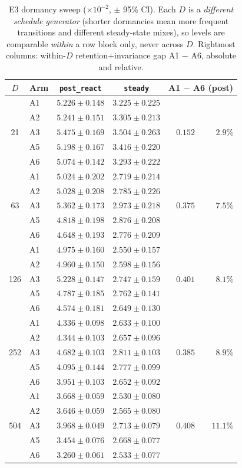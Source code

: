 \documentclass[11pt,a4paper]{article}
\theoremstyle{definition}
\theoremstyle{plain}
\begin{document}
\begin{table}[h]
\centering
\caption{E3 dormancy sweep ($\times 10^{-2}$, $\pm$ 95\% CI). Each $D$ is a
\emph{different schedule generator} (shorter dormancies mean more frequent
transitions and different steady-state mixes), so levels are comparable
\emph{within} a row block only, never across $D$. Rightmost columns:
within-$D$ retention$+$invariance gap A1 $-$ A6, absolute and relative.}
\label{tab:dd5-e3}
\small
\begin{tabular}{clccr@{\quad}r}
\toprule
$D$ & Arm & \texttt{post\_react} & \texttt{steady} &
\multicolumn{2}{c}{A1 $-$ A6 (post)} \\
\midrule
\multirow{5}{*}{21}
& A1 & $5.226 \pm 0.148$ & $3.225 \pm 0.225$ & & \\
& A2 & $5.241 \pm 0.151$ & $3.305 \pm 0.213$ & & \\
& A3 & $5.475 \pm 0.169$ & $3.504 \pm 0.263$ & $0.152$ & $2.9\%$ \\
& A5 & $5.198 \pm 0.167$ & $3.416 \pm 0.220$ & & \\
& A6 & $5.074 \pm 0.142$ & $3.293 \pm 0.222$ & & \\
\midrule
\multirow{5}{*}{63}
& A1 & $5.024 \pm 0.202$ & $2.719 \pm 0.214$ & & \\
& A2 & $5.028 \pm 0.208$ & $2.785 \pm 0.226$ & & \\
& A3 & $5.362 \pm 0.173$ & $2.973 \pm 0.218$ & $0.375$ & $7.5\%$ \\
& A5 & $4.818 \pm 0.198$ & $2.876 \pm 0.208$ & & \\
& A6 & $4.648 \pm 0.193$ & $2.776 \pm 0.209$ & & \\
\midrule
\multirow{5}{*}{126}
& A1 & $4.975 \pm 0.160$ & $2.550 \pm 0.157$ & & \\
& A2 & $4.960 \pm 0.150$ & $2.598 \pm 0.156$ & & \\
& A3 & $5.228 \pm 0.147$ & $2.747 \pm 0.159$ & $0.401$ & $8.1\%$ \\
& A5 & $4.787 \pm 0.185$ & $2.762 \pm 0.141$ & & \\
& A6 & $4.574 \pm 0.181$ & $2.649 \pm 0.130$ & & \\
\midrule
\multirow{5}{*}{252}
& A1 & $4.336 \pm 0.098$ & $2.633 \pm 0.100$ & & \\
& A2 & $4.344 \pm 0.103$ & $2.657 \pm 0.096$ & & \\
& A3 & $4.682 \pm 0.103$ & $2.811 \pm 0.103$ & $0.385$ & $8.9\%$ \\
& A5 & $4.095 \pm 0.144$ & $2.777 \pm 0.099$ & & \\
& A6 & $3.951 \pm 0.103$ & $2.652 \pm 0.092$ & & \\
\midrule
\multirow{5}{*}{504}
& A1 & $3.668 \pm 0.059$ & $2.530 \pm 0.080$ & & \\
& A2 & $3.646 \pm 0.059$ & $2.565 \pm 0.080$ & & \\
& A3 & $3.968 \pm 0.049$ & $2.713 \pm 0.079$ & $0.408$ & $11.1\%$ \\
& A5 & $3.454 \pm 0.076$ & $2.668 \pm 0.077$ & & \\
& A6 & $3.260 \pm 0.061$ & $2.533 \pm 0.077$ & & \\
\bottomrule
\end{tabular}
\end{table}
\end{document}
